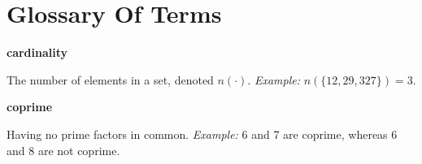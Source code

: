 \chapter{Glossary Of Terms}

\label{cglo0}

\begin{vworktermglossaryenum}


\item {}\textbf{cardinality}

      The number of elements in a set, denoted $n( \cdot )$. 
      \emph{Example:} $n( \{ 12 , 29 , 327 \} ) = 3$.  

\item {}\textbf{coprime}

      Having no prime factors in common.
      \emph{Example:} 6 and 7 are coprime, whereas 6 and 8 are not coprime.  


\end{vworktermglossaryenum}

